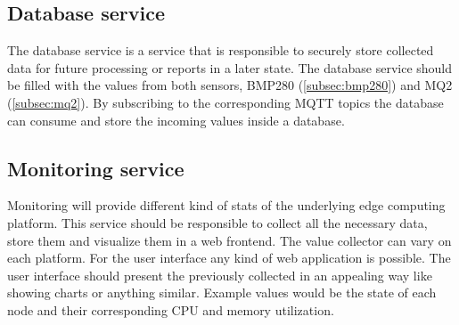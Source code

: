 \subsection{Database service}\label{subsec:database-service}
The database service is a service that is responsible to securely store collected data for future processing or reports in a later state. The database service should be filled with the values from both sensors, BMP280 (\ref{subsec:bmp280}) and MQ2 (\ref{subsec:mq2}). By subscribing to the corresponding MQTT topics the database can consume and store the incoming values inside a database.

\subsection{Monitoring service}\label{subsec:monitoring-service}
Monitoring will provide different kind of stats of the underlying edge computing platform. This service should be responsible to collect all the necessary data, store them and visualize them in a web frontend. The value collector can vary on each platform. For the user interface any kind of web application is possible. The user interface should present the previously collected in an appealing way like showing charts or anything similar. Example values would be the state of each node and their corresponding CPU and memory utilization.
